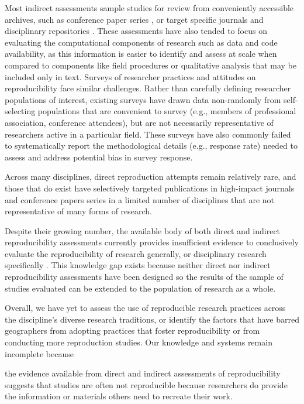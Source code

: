 \documentclass[]{interact}
\theoremstyle{plain}%
\theoremstyle{definition}
\theoremstyle{remark}
\begin{document}
Most indirect assessments sample studies for review from conveniently accessible archives, such as conference paper series \citep{gundersen2018state, ostermann2017}, or target specific journals and disciplinary repositories \citep{stodden2018empirical, stodden2018enabling, byrne_2017}.
These assessments have also tended to focus on evaluating the computational components of research such as data and code availability, as this information is easier to identify and assess at scale when compared to components like field procedures or qualitative analysis that may be included only in text. 
Surveys of researcher practices and attitudes on reproducibility face similar challenges. 
Rather than carefully defining researcher populations of interest, existing surveys have drawn data non-randomly from self-selecting populations that are convenient to survey (e.g., members of professional association, conference attendees), but are not necessarily representative of researchers active in a particular field. 
These surveys have also commonly failed to systematically report the methodological details (e.g., response rate) needed to assess and address potential bias in survey response. 

Across many disciplines, direct reproduction attempts remain relatively rare, and those that do exist \citep[see][]{chang2015economics, moraila2014measuring, iqbal2016reproducible,sumner2020reproducibility} have selectively targeted publications in high-impact journals and conference papers series in a limited number of disciplines that are not representative of many forms of research.

Despite their growing number, the available body of both direct and indirect reproducibility assessments currently provides insufficient evidence to conclusively evaluate the reproducibility of research generally, or disciplinary research specifically \citep{NASEM2019}.
This knowledge gap exists because neither direct nor indirect reproducibility assessments have been designed so the results of the sample of studies evaluated can be extended to the population of research as a whole.

Overall, we have yet to assess the use of reproducible research practices across the discipline's diverse research traditions, or identify the factors that have barred geographers from adopting practices that foster reproducibility or from conducting more reproduction studies.
Our knowledge and systems remain incomplete because 

the evidence available from direct and indirect assessments of reproducibility suggests that studies are often not reproducible because researchers do provide the information or materials others need to recreate their work. 
\end{document}
